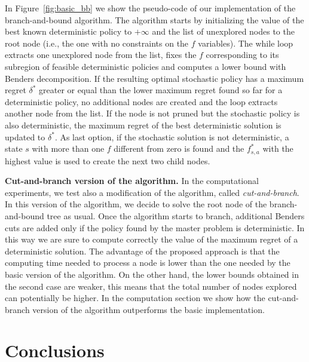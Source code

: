 \documentclass[sigconf]{aamas}  %
\begin{document}
In Figure~\ref{fig:basic_bb} we show the pseudo-code of our implementation of the branch-and-bound algorithm. The algorithm starts by initializing the value of the best known deterministic policy to $+\infty$ and the list of unexplored nodes to the root node (i.e., the one with no constraints on the $f$ variables).
The while loop extracts one unexplored node from the list, fixes the $f$ corresponding to its subregion of feasible deterministic policies and computes a lower bound with Benders decomposition. If the resulting optimal stochastic policy has a maximum regret $\delta^*$ greater or equal than the lower maximum regret found so far for a deterministic policy, no additional nodes are created and the loop extracts another node from the list. If the node is not pruned but the stochastic policy is also deterministic, the maximum regret of the best deterministic solution is updated to $\delta^*$. As last option, if the stochastic solution is not deterministic, a state $s$ with more than one $f$ different from zero is found and the $f^*_{s,a}$ with the highest value is used to create the next two child nodes.

\textbf{Cut-and-branch version of the algorithm.}  %
In the computational experiments, we test also a modification of the algorithm, called \textit{cut-and-branch}. In this version of the algorithm, we decide to solve the root node of the branch-and-bound tree as usual. %
Once the algorithm starts to branch, additional Benders cuts are added only if the policy found by the master problem is deterministic. In this way we are sure to compute correctly the value of the maximum regret of a deterministic solution. The advantage of the proposed approach is that the computing time needed to process a node is lower than the one needed by the basic version of the algorithm. On the other hand, the lower bounds obtained in the second case are weaker, this means that the total number of nodes explored can potentially be higher.
In the computation section we show how the cut-and-branch version of the algorithm outperforms the basic implementation.    









\section{Conclusions}
		







\end{document}
